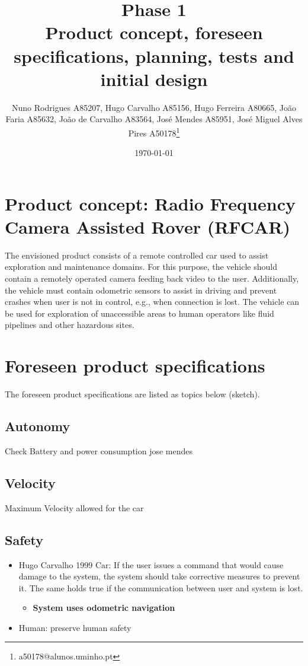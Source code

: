 \documentclass[11pt]{article}
\author{Nuno Rodrigues A85207, Hugo Carvalho A85156, Hugo Ferreira A80665, João Faria A85632, João de Carvalho A83564, José Mendes A85951, José Miguel Alves Pires A50178\thanks{a50178@alunos.uminho.pt}}
\date{\today}
\title{Phase 1\\\medskip
\large Product concept, foreseen specifications, planning, tests and initial design}
\begin{document}
\maketitle
\tableofcontents


\section{Product concept: Radio Frequency Camera Assisted Rover (RFCAR)}
\label{sec:orgf4f2e51}
The envisioned product consists of a remote controlled car used to assist
exploration and maintenance domains. For this purpose, the vehicle should contain a
remotely operated camera feeding back video to the user. Additionally, the
vehicle must contain odometric sensors to assist in driving and prevent
crashes when user is not in control, e.g., when connection is lost.
The vehicle can be used for exploration of unaccessible areas to human operators
like fluid pipelines and other hazardous sites.

\section{Foreseen product specifications}
\label{sec:org942ed5c}
The foreseen product specifications are listed as topics below (sketch).

\subsection{Autonomy}
\label{sec:org7364ba5}
Check Battery and power consumption jose mendes
\subsection{Velocity}
\label{sec:orgb41b31b}
Maximum Velocity allowed for the car
\subsection{Safety}
\label{sec:org4323985}
\begin{itemize}
\item Hugo Carvalho 1999 Car: If the user issues a command that would cause damage to the system, the
system should take corrective measures to prevent it. The same holds true if
the communication between user and system is lost.
\begin{itemize}
\item \textbf{System uses odometric navigation}
\end{itemize}
\item Human: preserve human safety
\end{itemize}
\end{document}
